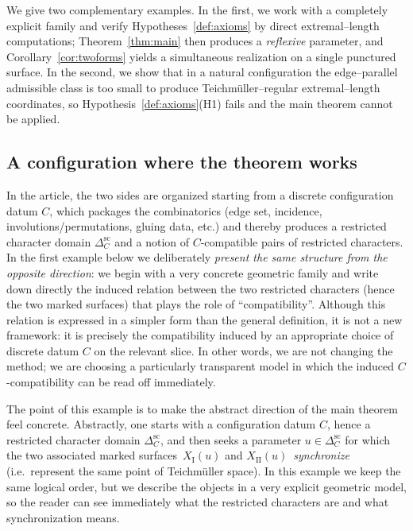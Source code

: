 \documentclass[a4paper,12pt]{amsart}
\theoremstyle{plain}
\theoremstyle{definition}
\begin{document}
\medskip
We give two complementary examples.  In the first, we work with a completely explicit family and verify
Hypotheses~\ref{def:axioms} by direct extremal--length computations; Theorem~\ref{thm:main} then produces a
\emph{reflexive} parameter, and Corollary~\ref{cor:twoforms} yields a simultaneous realization on a single
punctured surface.  In the second, we show that in a natural configuration the edge--parallel admissible
class is too small to produce Teichm\"uller--regular extremal--length coordinates, so
Hypothesis~\ref{def:axioms}(H1) fails and the main theorem cannot be applied.

\medskip


\subsection{A configuration where the theorem works}\label{subsec:good_example}

In the article, the two sides are organized starting from a discrete configuration datum \(C\),
which packages the combinatorics (edge set, incidence, involutions/permutations, gluing data, etc.) and
thereby produces a restricted character domain \(\Delta_C^{\mathrm{sc}}\) and a notion of \(C\)-compatible
pairs of restricted characters.
In the first example below we deliberately \emph{present the same structure from the opposite direction}:
we begin with a very concrete geometric family and write down directly the induced relation between the two
restricted characters (hence the two marked surfaces) that plays the role of “compatibility”.
Although this relation is expressed in a simpler form than the general definition, it is not a new
framework: it is precisely the compatibility induced by an appropriate choice of discrete datum \(C\) on the
relevant slice.  In other words, we are not changing the method; we are choosing a particularly transparent
model in which the induced \(C\)-compatibility can be read off immediately.


The point of this example is to make the abstract direction of the main theorem feel concrete.
Abstractly, one starts with a configuration datum \(C\), hence a restricted character domain
\(\Delta_C^{\mathrm{sc}}\), and then seeks a parameter \(u\in \Delta_C^{\mathrm{sc}}\) for which the two
associated marked surfaces \(\,X_{\mathrm{I}}(u)\) and \(X_{\mathrm{II}}(u)\,\) \emph{synchronize} (i.e.\ represent the same point of Teichm\"uller space).
In this example we keep the same logical order, but we describe the objects in a very explicit geometric model,
so the reader can see immediately what the restricted characters are and what synchronization means.   
\end{document}

